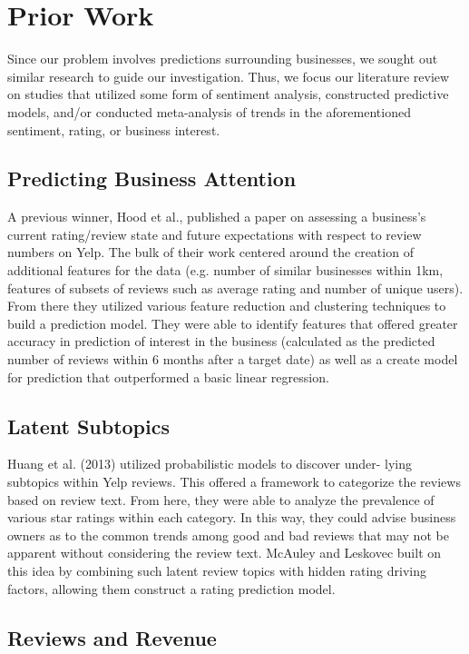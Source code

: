 \section{Prior Work}

Since our problem involves predictions surrounding businesses, we sought out similar research to guide our investigation. Thus, we focus our literature review on studies that utilized some form of sentiment analysis, constructed predictive models, and/or conducted meta-analysis of trends in the aforementioned sentiment, rating, or business interest.

\subsection{Predicting Business Attention}

A previous winner, Hood et al., published a paper on assessing a business's current rating/review state and future expectations with respect to review numbers on Yelp. The bulk of their work centered around the creation of additional features for the data (e.g. number of similar businesses within 1km, features of subsets of reviews such as average rating and number of unique users). From there they utilized various feature reduction and clustering techniques to build a prediction model. They were able to identify features that offered greater accuracy in prediction of interest in the business (calculated as the predicted number of reviews within 6 months after a target date) as well as a create model for prediction that outperformed a basic linear regression.

\subsection{Latent Subtopics}

Huang et al. (2013) utilized probabilistic models to discover under- lying subtopics within Yelp reviews. This offered a framework to categorize the reviews based on review text. From here, they were able to analyze the prevalence of various star ratings within each category. In this way, they could advise business owners as to the common trends among good and bad reviews that may not be apparent without considering the review text. McAuley and Leskovec built on this idea by combining such latent review topics with hidden rating driving factors, allowing them construct a rating prediction model.

\subsection{Reviews and Revenue}

